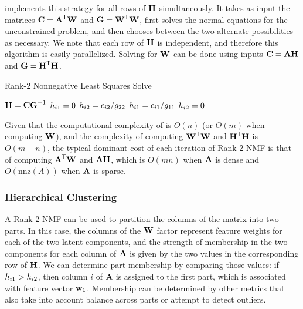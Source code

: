 \documentclass[conference,compsoc]{IEEEtran}
\begin{document}
 implements this strategy for all rows of $\M{H}$ simultaneously.
It takes as input the matrices $\M{C}=\M{A}^\Tra\M{W}$ and $\M{G}=\M{W}^\Tra\M{W}$, first solves the normal equations for the unconstrained problem, and then chooses between the two alternate possibilities as necessary.
We note that each row of $\M{H}$ is independent, and therefore this algorithm is easily parallelized.
Solving for $\M{W}$ can be done using inputs $\M{C}=\M{A}\M{H}$ and $\M{G}=\M{H}^\Tra\M{H}$.

\begin{algorithm}
\caption{Rank-2 Nonnegative Least Squares Solve \cite{KP13}}
\label{alg:r2nnls}
\begin{algorithmic}[1]
		\State $\M{H} = \M{C}\M{G}^{-1}$ \hfill {}
				\State {}
					\State $\ME{H}{i1} = 0$
					\State $\ME{H}{i2} = \ME{C}{i2} / \ME{G}{22}$
				\Else
					\State $\ME{H}{i1} = \ME{C}{i1} / \ME{G}{11}$
					\State $\ME{H}{i2} = 0$
				\EndIf
			\EndIf
		\EndFor
	\EndFunction
\end{algorithmic}
\end{algorithm}

Given that the computational complexity of  is $O(n)$ (or $O(m)$ when computing $\M{W}$), and the complexity of computing $\M{W}^\Tra\M{W}$ and $\M{H}^\Tra\M{H}$ is $O(m+n)$, the typical dominant cost of each iteration of Rank-2 NMF is that of computing $\M{A}^\Tra\M{W}$ and $\M{A}\M{H}$, which is $O(mn)$ when $\M{A}$ is dense and $O(\text{nnz}(A))$ when $\M{A}$ is sparse.

\subsubsection{Hierarchical Clustering}

A Rank-2 NMF can be used to partition the columns of the matrix into two parts.
In this case, the columns of the $\M{W}$ factor represent feature weights for each of the two latent components, and the strength of membership in the two components for each column of $\M{A}$ is given by the two values in the corresponding row of $\M{H}$.
We can determine part membership by comparing those values: if $\ME{H}{i1} > \ME{H}{i2}$, then column $i$ of $\M{A}$ is assigned to the first part, which is associated with feature vector $\V{w}_1$.
Membership can be determined by other metrics that also take into account balance across parts or attempt to detect outliers.
\end{document}
